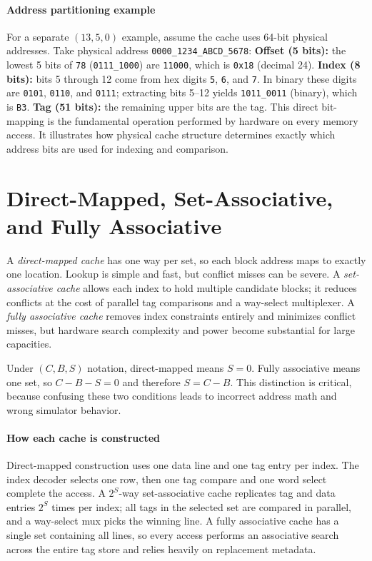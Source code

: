 \paragraph{Address partitioning example}\label{par:auto-018}
For a separate $(13,5,0)$ example, assume the cache uses 64-bit physical addresses.
Take physical address \texttt{0000\_1234\_ABCD\_5678}:
\textbf{Offset (5 bits):} the lowest 5 bits of \texttt{78} (\texttt{0111\_1000}) are \texttt{11000}, which is \texttt{0x18} (decimal 24).
\textbf{Index (8 bits):} bits 5 through 12 come from hex digits \texttt{5}, \texttt{6}, and \texttt{7}.
In binary these digits are \texttt{0101}, \texttt{0110}, and \texttt{0111}; extracting bits 5--12 yields \texttt{1011\_0011} (binary), which is \texttt{B3}.
\textbf{Tag (51 bits):} the remaining upper bits are the tag.
This direct bit-mapping is the fundamental operation performed by hardware on every memory access.
It illustrates how physical cache structure determines exactly which address bits are used for indexing and comparison.


\section{Direct-Mapped, Set-Associative, and Fully Associative}\label{sec:auto-023}
A \textit{direct-mapped cache} has one way per set, so each block address maps to exactly one location.
Lookup is simple and fast, but conflict misses can be severe.
A \textit{set-associative cache} allows each index to hold multiple candidate blocks; it reduces conflicts at the cost of parallel tag comparisons and a way-select multiplexer.
A \textit{fully associative cache} removes index constraints entirely and minimizes conflict misses, but hardware search complexity and power become substantial for large capacities.

Under $(C,B,S)$ notation, direct-mapped means $S=0$.
Fully associative means one set, so $C-B-S=0$ and therefore $S=C-B$.
This distinction is critical, because confusing these two conditions leads to incorrect address math and wrong simulator behavior.

\paragraph{How each cache is constructed}\label{par:auto-019}
Direct-mapped construction uses one data line and one tag entry per index.
The index decoder selects one row, then one tag compare and one word select complete the access.
A $2^S$-way set-associative cache replicates tag and data entries $2^S$ times per index; all tags in the selected set are compared in parallel, and a way-select mux picks the winning line.
A fully associative cache has a single set containing all lines, so every access performs an associative search across the entire tag store and relies heavily on replacement metadata.


